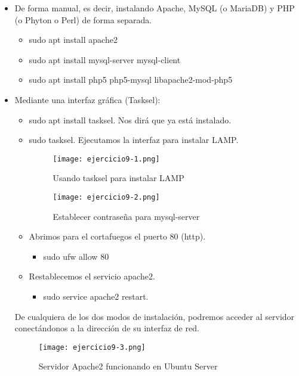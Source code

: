 	\begin{itemize}
		\item De forma manual, es decir, instalando Apache, MySQL (o MariaDB) y PHP (o Phyton o Perl) de forma separada.
			\begin{itemize}
				\item sudo apt install apache2
				\item sudo apt install mysql-server mysql-client 
				\item sudo apt install php5 php5-mysql libapache2-mod-php5 
			\end{itemize}
		\item Mediante una interfaz gráfica (Tasksel\cite{ejercicio9-3}):
		\begin{itemize}
			\item sudo apt install tasksel. Nos dirá que ya está instalado.
			\item sudo tasksel. Ejecutamos la interfaz para instalar LAMP.
			\begin{figure}[H]	
				\centering
				\texttt{[image: ejercicio9-1.png]} 
				\label{figura66} 
				\caption{Usando tasksel para instalar LAMP}
			\end{figure}
			\begin{figure}[H]	
				\centering
				\texttt{[image: ejercicio9-2.png]} 
				\label{figura67} 
				\caption{Establecer contraseña para mysql-server}
			\end{figure}
			\item Abrimos para el cortafuegos el puerto 80 (http).
			\begin{itemize}
				\item sudo ufw allow 80
			\end{itemize}
			\item Restablecemos el servicio apache2.
			\begin{itemize}
				\item sudo service apache2 restart.
			\end{itemize}
			
		\end{itemize}
				
		De cualquiera de los dos modos de instalación, podremos acceder al servidor conectándonos a la dirección de su interfaz de red.
		
		\begin{figure}[H]	
			\centering
			\texttt{[image: ejercicio9-3.png]} 
			\label{figura68} 
			\caption{Servidor Apache2 funcionando en Ubuntu Server}
		\end{figure}
		

\end{itemize}

